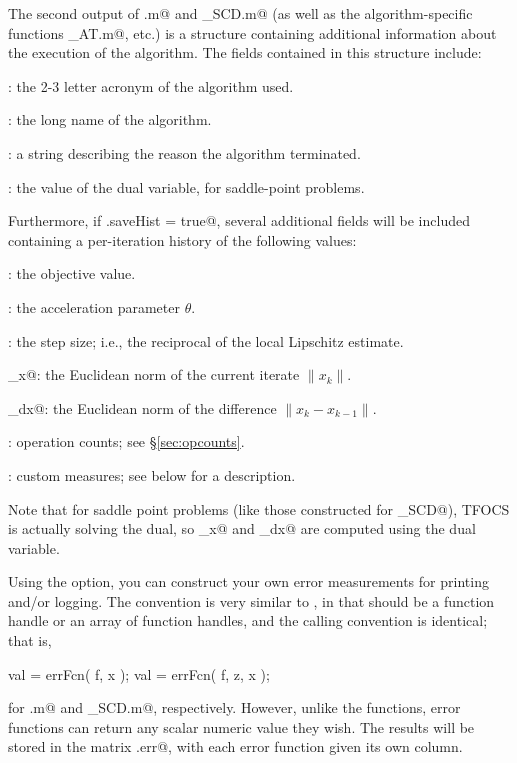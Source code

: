 \documentclass{article}
\begin{document}
The second output \verb@out@ of \verb@tfocs.m@ and \verb@tfocs_SCD.m@ (as well
as the algorithm-specific functions \verb@tfocs_AT.m@, etc.) is a structure
containing additional information about the execution of the algorithm.
The fields contained in this structure include:
\begin{trivlist}
\item \verb@alg@: the 2-3 letter acronym of the algorithm used.
\item \verb@algorithm@: the long name of the algorithm.
\item \verb@status@: a string describing the reason the algorithm terminated.
\item \verb@dual@: the value of the dual variable, for saddle-point problems.
\end{trivlist}
Furthermore, if \verb@opts.saveHist = true@, several additional fields
will be included containing a per-iteration history of the following values:
\begin{trivlist}
\item \verb@f@: the objective value.
\item \verb@theta@: the acceleration parameter $\theta$.
\item \verb@stepsize@: the step size; i.e., the reciprocal of the local Lipschitz estimate.
\item \verb@norm_x@: the Euclidean norm of the current iterate $\|x_k\|$.
\item \verb@norm_dx@: the Euclidean norm of the difference $\|x_k-x_{k-1}\|$.
\item \verb@counts@: operation counts; see \S\ref{sec:opcounts}.
\item \verb@err@: custom measures; see below for a description.
\end{trivlist}
Note that for saddle point problems (like those constructed for
\verb@tfocs_SCD@), TFOCS is actually solving the dual, so
\verb@norm_x@ and \verb@norm_dx@ are computed using the dual variable.

Using the \verb@errFcn@ option, you can construct your own error measurements
for printing and/or logging. The convention is very similar to \verb@stopFcn@,
in that \verb@errFcn@ should be a function handle or an array of function handles,
and the calling convention is identical; that is,
\begin{code}
	val = errFcn( f, x );
	val = errFcn( f, z, x );
\end{code}
for \verb@tfocs.m@ and \verb@tfocs_SCD.m@, respectively.
However, unlike the \verb@stopFcn@ functions, error functions can return
any scalar numeric value they wish. The results will be stored in the matrix
\verb@out.err@, with each error function given its own column.
\end{document}
